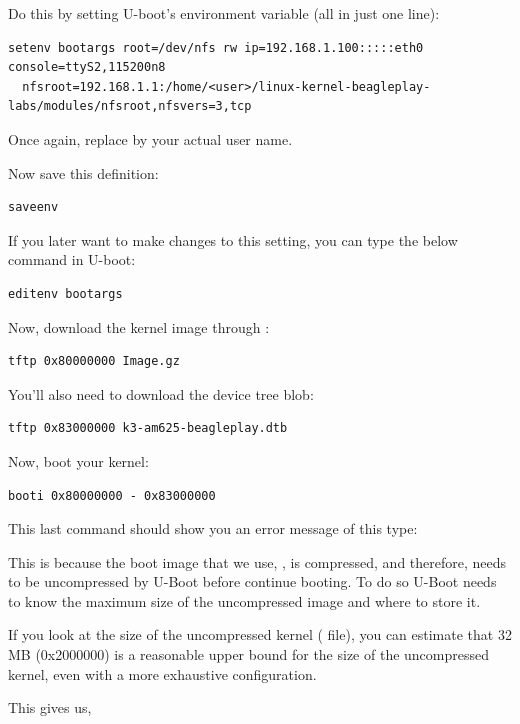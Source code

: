 Do this by setting U-boot's  environment variable (all in
just one line):

\begin{verbatim}
setenv bootargs root=/dev/nfs rw ip=192.168.1.100:::::eth0 console=ttyS2,115200n8
  nfsroot=192.168.1.1:/home/<user>/linux-kernel-beagleplay-labs/modules/nfsroot,nfsvers=3,tcp
\end{verbatim}

Once again, replace  by your actual user name.

Now save this definition:
\begin{verbatim}
saveenv
\end{verbatim}

If you later want to make changes to this setting, you can type the
below command in U-boot:

\begin{verbatim}
editenv bootargs
\end{verbatim}

Now, download the kernel image through :

\begin{verbatim}
tftp 0x80000000 Image.gz
\end{verbatim}

You'll also need to download the device tree blob:

\begin{verbatim}
tftp 0x83000000 k3-am625-beagleplay.dtb
\end{verbatim}

Now, boot your kernel:

\begin{verbatim}
booti 0x80000000 - 0x83000000
\end{verbatim}

This last command should show you an error message of this type:

This is because the boot image that we use, , is compressed, and
therefore, needs to be uncompressed by U-Boot before continue booting. To do so
U-Boot needs to know the maximum size of the uncompressed image and where to
store it.

If you look at the size of the uncompressed kernel ( file),
you can estimate that 32 MB (0x2000000) is a reasonable upper bound
for the size of the uncompressed kernel, even with a more exhaustive
configuration.

This gives us,

